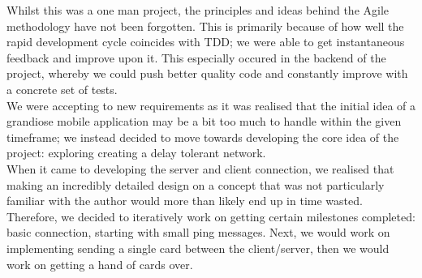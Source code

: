 \documentclass[11pt]{article}
\begin{document}
Whilst this was a one man project, the principles and ideas behind the Agile methodology have not been forgotten. This is primarily because of how well the rapid development cycle coincides with TDD; we were able to get instantaneous feedback and improve upon it. This especially occured in the backend of the project, whereby we could push better quality code and constantly improve with a concrete set of tests. \\

We were accepting to new requirements as it was realised that the initial idea of a grandiose mobile application may be a bit too much to handle within the given timeframe; we instead decided to move towards developing the core idea of the project: exploring creating a delay tolerant network. \\

When it came to developing the server and client connection, we realised that making an incredibly detailed design on a concept that was not particularly familiar with the author would more than likely end up in time wasted. Therefore, we decided to iteratively work on getting certain milestones completed: basic connection, starting with small ping messages. Next, we would work on implementing sending a single card between the client/server, then we would work on getting a hand of cards over. \\



\end{document}
